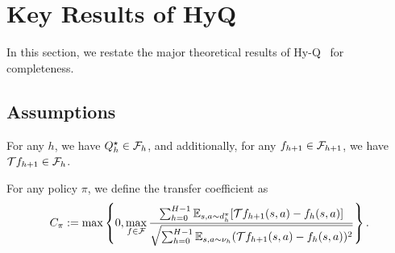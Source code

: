 \section{Key Results of HyQ~\citep{song2023hybrid}}
In this section, we restate the major theoretical results of Hy-Q~\citep{song2023hybrid} for completeness. 

\subsection{Assumptions}

\label{subsec:HyQ-assumptions}

\begin{assumption}
\label{assump:realizability-completeness}
For any $h$, we have $Q^\star_h\in \mathcal F_h$, and additionally, for any $f_{h+1}\in \mathcal F_{h+1}$, we have $\mathcal T f_{h+1}\in \mathcal F_h$.
\end{assumption}



\begin{definition}
\label{def:bellman-error-coeff-hy-q}
For any policy $\pi$, we define the transfer coefficient as 
\begin{equation}
    C_\pi:=\max\left\{ 0,\max_{f\in \mathcal F}\frac{\sum_{h=0}^{H-1}\mathbb E_{s,a\sim d_h^\pi}[\mathcal T f_{h+1}(s,a)-f_h(s,a)]}{\sqrt{\sum_{h=0}^{H-1}\mathbb E_{s,a\sim \nu_h}(\mathcal T f_{h+1}(s,a)-f_h(s,a))^2}} \right\}.
\end{equation}
\end{definition}

